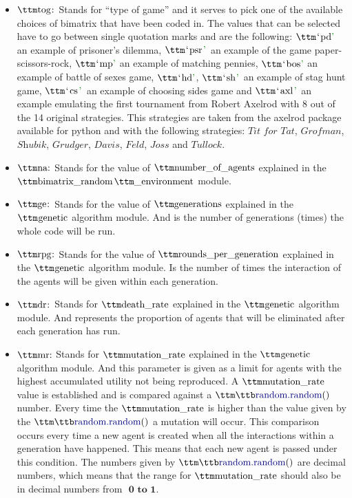 \begin{itemize}
	\item $\pythoninline{tog:}$ Stands for ``type of game'' and it serves to pick one of the available choices of bimatrix that have been coded in. The values that can be selected have to go between single quotation marks and are the following: $\pythoninline{`pd'}$ an example of prisoner's dilemma, $\pythoninline{`psr'}$ an example of the game paper-scissors-rock, $\pythoninline{`mp'}$ an example of matching pennies, $\pythoninline{`bos'}$ an example of battle of sexes game, $\pythoninline{`hd'}$, $\pythoninline{`sh'}$ an example of stag hunt game, $\pythoninline{`cs'}$ an example of choosing sides game and $\pythoninline{`axl'}$ an example emulating the first tournament from Robert Axelrod with 8 out of the 14 original strategies. This strategies are taken from the axelrod package available for python and with the following strategies: $\textit{Tit for Tat}$, $\textit{Grofman}$, $\textit{Shubik}$, $\textit{Grudger}$, $\textit{Davis}$, $\textit{Feld}$, $\textit{Joss}$ and $\textit{Tullock}$.
	\item$\pythoninline{na:}$ Stands for the value of $\pythoninline{number\_of\_agents}$ explained in the $\pythoninline{bimatrix\_random}$$\pythoninline{\_environment}$ module.
	\item $\pythoninline{ge:}$ Stands for the value of $\pythoninline{generations}$ explained in the $\pythoninline{genetic}$ algorithm module. And is the number of generations (times) the whole code will be run.
	\item $\pythoninline{rpg:}$ Stands for the value of $\pythoninline{rounds\_per\_generation}$ explained in the $\pythoninline{genetic}$  algorithm module. Is the number of times the interaction of the agents will be given within each generation. 
	\item $\pythoninline{dr:}$ Stands for $\pythoninline{death\_rate}$ explained in the $\pythoninline{genetic}$ algorithm module. And represents the proportion of agents that will be eliminated after each generation has run.
	\item $\pythoninline{mr:}$ Stands for $\pythoninline{mutation\_rate}$ explained in the $\pythoninline{genetic}$ algorithm module. And this parameter is given as a limit for agents with the highest accumulated utility not being reproduced. A $\pythoninline{mutation\_rate}$ value is established and is compared against a $\pythoninline{random.random()}$ number. Every time the $\pythoninline{mutation\_rate}$ is higher than the value given by the $\pythoninline{random.random()}$ a mutation will occur. This comparison occurs every time a new agent is created when all the interactions within a generation have happened. This means that each new agent is passed under this condition. The numbers given by $\pythoninline{random.random()}$ are decimal numbers, which means that the range for $\pythoninline{mutation\_rate}$ should also be in decimal numbers from $\textbf{ 0 to 1}$.
$$
\end{itemize}
